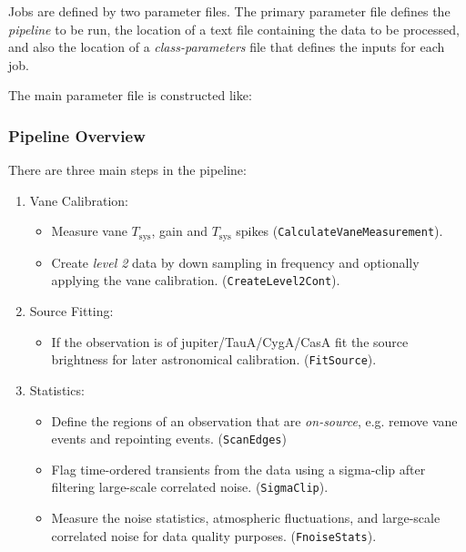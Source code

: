 \documentclass[11pt]{article}
\begin{document}
Jobs are defined by two parameter files. The primary parameter file defines the \textit{pipeline} to be run, the location of a text file containing the data to be processed, and also the location of a \textit{class-parameters} file that defines the inputs for each job.

The main parameter file is constructed like:

{\center
\noindent{}
}



\subsubsection{Pipeline Overview}

There are three main steps in the pipeline:
\begin{enumerate}
  \item Vane Calibration: 
    \begin{itemize}
      \item Measure vane $T_\mathrm{sys}$, gain and $T_\mathrm{sys}$ spikes (\texttt{CalculateVaneMeasurement}).
      \item Create \textit{level 2} data by down sampling in frequency and optionally applying the vane calibration. (\texttt{CreateLevel2Cont}).
    \end{itemize}
   \item Source Fitting:
    \begin{itemize}
      \item If the observation is of jupiter/TauA/CygA/CasA fit the source brightness for later astronomical calibration. (\texttt{FitSource}).
    \end{itemize}
   \item Statistics:
     \begin{itemize}
       \item Define the regions of an observation that are \textit{on-source}, e.g. remove vane events and repointing events. (\texttt{ScanEdges})
         \item Flag time-ordered transients from the data using a sigma-clip after filtering large-scale correlated noise. (\texttt{SigmaClip}).
           \item Measure the noise statistics, atmospheric fluctuations, and large-scale correlated noise for data quality purposes. (\texttt{FnoiseStats}).
     \end{itemize}
\end{enumerate}
\end{document}
